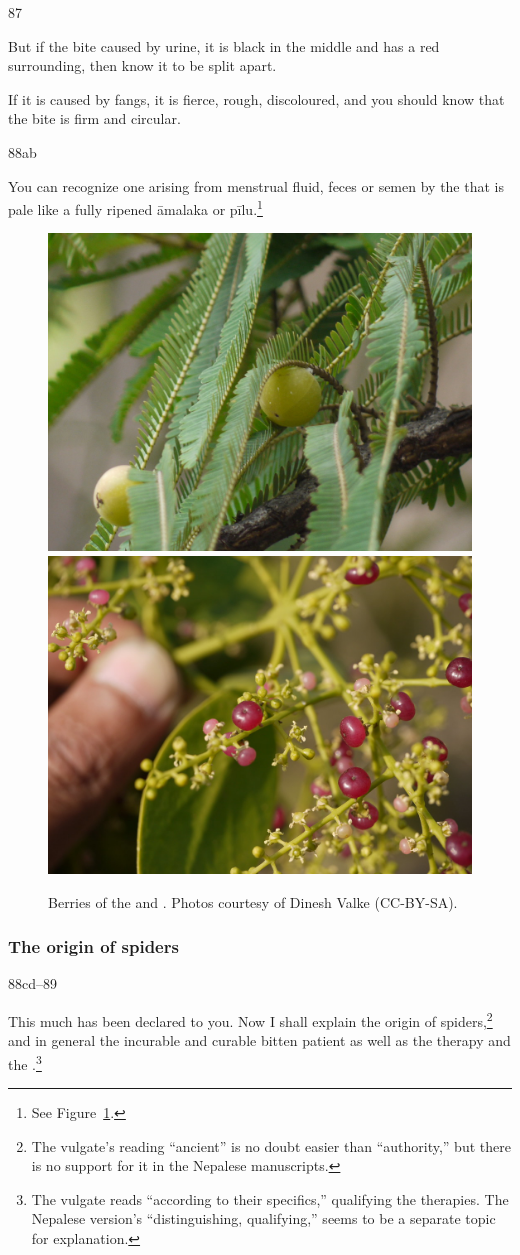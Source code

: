 \begin{translation}
\item[87]

But if the bite caused by urine, it is black in the middle and has a red 
surrounding, then know it to be split apart. 

If it is caused by fangs, it is fierce, rough, discoloured, and 
you  should know that the bite is firm and circular.

\item[88ab]

You can recognize one arising from menstrual fluid, feces or semen by
the  that is pale like a fully ripened \gls{āmalaka} or
\gls{pīlu}.\footnote{See Figure~\ref{fig:pilufruit}.}
\begin{figure}
    \centering
    \includegraphics[width=0.46\linewidth]{media/amalaka_fruit}
    \hfill
    \includegraphics[width=0.46\linewidth]{media/pilu_fruit}
        \caption{Berries of the  and . Photos 
        courtesy of Dinesh Valke (CC-BY-SA).}
    \label{fig:pilufruit}
\end{figure}


\subsubsection{The origin of spiders}
\item[88cd--89]

This much has been declared to you.  Now I shall explain the
 origin of spiders,\footnote{The vulgate's reading
     “ancient” is no doubt easier than 
    “authority,” but there is no support for it in the Nepalese
    manuscripts.} and in general the incurable and curable bitten patient as well 
    as the therapy and the .\footnote{The vulgate 
        reads  “according to their specifics,” qualifying the 
        therapies.  The Nepalese version's  “distinguishing, 
        qualifying,” seems to be a separate topic for explanation.}
    

\end{translation}

